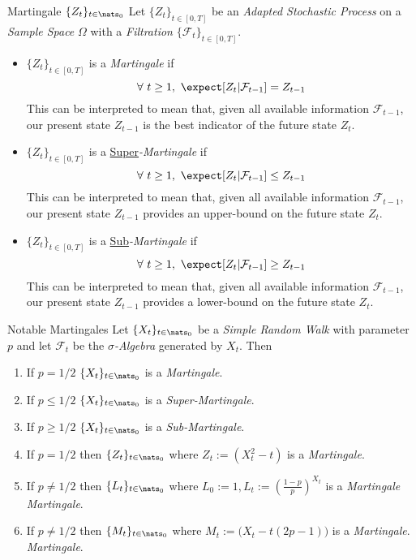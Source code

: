 \documentclass[11pt,a4paper]{article}
\begin{document}
  \begin{definition}{Martingale $\{Z_t\}_{t\in\nats_0}$}
    Let $\{Z_t\}_{t\in[0,T]}$ be an \textit{Adapted Stochastic Process} on a \textit{Sample Space} $\Omega$ with a \textit{Filtration} $\{\mathcal{F}_t\}_{t\in[0,T]}$.
    \begin{itemize}
      \item $\{Z_t\}_{t\in[0,T]}$ is a \textit{Martingale} if
      \[ \forall\ t\geq1,\ \expect[Z_t|\mathcal{F}_{t-1}]=Z_{t-1} \]
      This can be interpreted to mean that, given all available information $\mathcal{F}_{t-1}$, our present state $Z_{t-1}$ is the best indicator of the future state $Z_t$.
      \item $\{Z_t\}_{t\in[0,T]}$ is a \underline{Super}\textit{-Martingale} if
      \[ \forall\ t\geq1,\ \expect[Z_t|\mathcal{F}_{t-1}]\leq Z_{t-1} \]
      This can be interpreted to mean that, given all available information $\mathcal{F}_{t-1}$, our present state $Z_{t-1}$ provides an upper-bound on the future state $Z_t$.
      \item $\{Z_t\}_{t\in[0,T]}$ is a \underline{Sub}\textit{-Martingale} if
      \[ \forall\ t\geq1,\ \expect[Z_t|\mathcal{F}_{t-1}]\geq Z_{t-1} \]
      This can be interpreted to mean that, given all available information $\mathcal{F}_{t-1}$, our present state $Z_{t-1}$ provides a lower-bound on the future state $Z_t$.
    \end{itemize}
  \end{definition}

  \begin{proposition}{Notable Martingales}\label{prop_notable_martingales}
    Let $\{X_t\}_{t\in\nats_0}$ be a \textit{Simple Random Walk} with parameter $p$ and let $\mathcal{F}_t$ be the \textit{$\sigma$-Algebra} generated by $X_t$. Then
    \begin{enumerate}
      \item If $p=1/2$ $\{X_t\}_{t\in\nats_0}$ is a \textit{Martingale}.
      \item If $p\leq1/2$ $\{X_t\}_{t\in\nats_0}$ is a \textit{Super-Martingale}.
      \item If $p\geq1/2$ $\{X_t\}_{t\in\nats_0}$ is a \textit{Sub-Martingale}.
      \item If $p=1/2$ then $\{Z_t\}_{t\in\nats_0}$ where $Z_t:=(X_t^2-t)$ is a \textit{Martingale}.
      \item If $p\neq1/2$ then $\{L_t\}_{t\in\nats_0}$ where $L_0:=1,L_t:=\left(\frac{1-p}p\right)^{X_t}$ is a \textit{Martingale} \textit{Martingale}.
      \item If $p\neq1/2$ then $\{M_t\}_{t\in\nats_0}$ where $M_t:=\big(X_t-t(2p-1)\big)$ is a \textit{Martingale}. \textit{Martingale}.
    \end{enumerate}
  \end{proposition}
\end{document}
